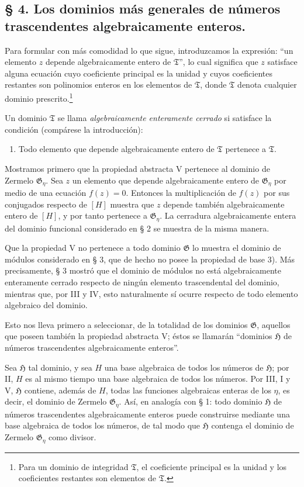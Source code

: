 \documentclass[11pt]{article}
\begin{document}
\subsection*{§ 4. Los dominios más generales de números trascendentes algebraicamente enteros.}

Para formular con más comodidad lo que sigue, introduzcamos la expresión: ``un elemento $z$ depende algebraicamente entero de $\mathfrak T$'', lo cual significa que $z$ satisface alguna ecuación cuyo coeficiente principal es la unidad y cuyos coeficientes restantes son polinomios enteros en los elementos de $\mathfrak T$, donde $\mathfrak T$ denota cualquier dominio prescrito.\footnote{Para un dominio de integridad $\mathfrak T$, el coeficiente principal es la unidad y los coeficientes restantes son elementos de $\mathfrak T$.}

Un dominio $\mathfrak T$ se llama \emph{algebraicamente enteramente cerrado} si satisface la condición (compárese la introducción):
\begin{enumerate}
\item[V.] Todo elemento que depende algebraicamente entero de $\mathfrak T$ pertenece a $\mathfrak T$.
\end{enumerate}

Mostramos primero que la propiedad abstracta V pertenece al dominio de Zermelo $\mathfrak G_\eta$. Sea $z$ un elemento que depende algebraicamente entero de $\mathfrak G_\eta$ por medio de una ecuación $f(z)=0$. Entonces la multiplicación de $f(z)$ por sus conjugados respecto de $[H]$ muestra que $z$ depende también algebraicamente entero de $[H]$, y por tanto pertenece a $\mathfrak G_\eta$. La cerradura algebraicamente entera del dominio funcional considerado en § 2 se muestra de la misma manera.

Que la propiedad V no pertenece a todo dominio $\mathfrak G$ lo muestra el dominio de módulos considerado en § 3, que de hecho no posee la propiedad de base 3). Más precisamente, § 3 mostró que el dominio de módulos no está algebraicamente enteramente cerrado respecto de ningún elemento trascendental del dominio, mientras que, por III y IV, esto naturalmente sí ocurre respecto de todo elemento algebraico del dominio.

Esto nos lleva primero a seleccionar, de la totalidad de los dominios $\mathfrak G$, aquellos que poseen también la propiedad abstracta V; éstos se llamarán ``dominios $\mathfrak H$ de números trascendentes algebraicamente enteros''.

Sea $\mathfrak H$ tal dominio, y sea $H$ una base algebraica de todos los números de $\mathfrak H$; por II, $H$ es al mismo tiempo una base algebraica de todos los números. Por III, I y V, $\mathfrak H$ contiene, además de $H$, todas las funciones algebraicas enteras de los $\eta$, es decir, el dominio de Zermelo $\mathfrak G_\eta$. Así, en analogía con § 1: todo dominio $\mathfrak H$ de números trascendentes algebraicamente enteros puede construirse mediante una base algebraica de todos los números, de tal modo que $\mathfrak H$ contenga el dominio de Zermelo $\mathfrak G_\eta$ como divisor.
\end{document}
